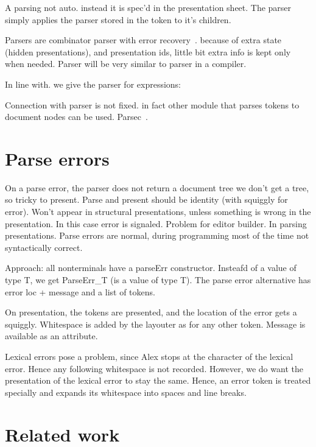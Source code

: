 \documentclass[12pt]{article}
\begin{document}
A parsing not auto. instead it is spec'd in the presentation sheet. The parser simply applies the parser stored in the token to it's children.

Parsers are combinator parser with error recovery~\cite{swierstra03polishParsers, swierstra08parserCombinators}.
because of extra state (hidden presentations), and presentation ids, little bit extra info is kept
only when needed. Parser will be very similar to parser in a compiler.


In line with. we give the parser for expressions:

Connection with parser is not fixed. in fact other module that parses tokens to document nodes can be used. Parsec~\cite{leijen08parsec}.



\section{Parse errors} \label{sect:parseScanErrors}

On a parse error, the parser does not return a document tree
we don't get a tree, so tricky to present. Parse and present should be identity (with squiggly for error). Won't appear in structural presentations, unless something is wrong in the presentation. In this case error is signaled. Problem for editor builder. In parsing presentations. Parse errors are normal, during programming most of the time not syntactically correct.

Approach: all nonterminals have a parseErr constructor. Insteafd of a value of type T, we get ParseErr\_T (is a value of type T). The parse error alternative has error loc + message and a list of tokens.

On presentation, the tokens are presented, and the location of the error gets a squiggly. Whitespace is added by the layouter as for any other token. Message is available as an attribute.

Lexical errors pose a problem, since Alex stops at the character of the lexical error. Hence any following whitespace is not recorded. However, we do want the presentation of the lexical error to stay the same. Hence, an error token  is treated specially and expands its whitespace into spaces and line breaks.


%
\section{Related work}
%
\end{document}
